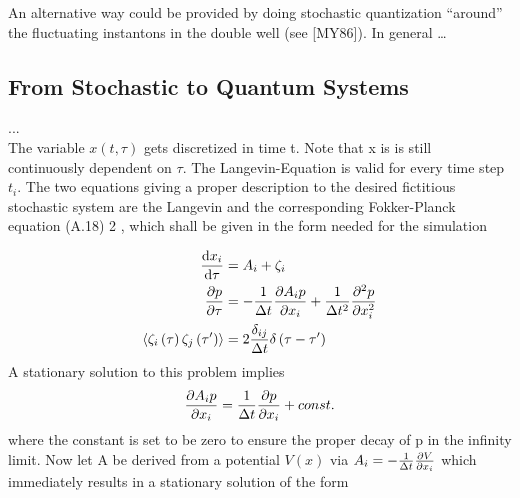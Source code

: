 \documentclass[11pt,a4paper]{scrartcl}
\begin{document}
An alternative way could be provided by doing stochastic quantization
\enquote{around} the fluctuating instantons in the double well (see [MY86]). In general \dots


\vspace{5\baselineskip}



\newpage

\subsection{From Stochastic to Quantum Systems}
...\\
\noindent The variable $x(t,\tau)$ gets discretized in time t. Note that x is is still continuously dependent on $\tau$. The Langevin-Equation is valid for every time step $t_i$. The two equations giving a proper description to the desired fictitious stochastic system
are the Langevin and the corresponding Fokker-Planck equation (A.18) 2 , which shall be
given in the form needed for the simulation

\begin{align}
    \dv{x_i}{\tau} &= A_i + \zeta_i\\
    \pdv{p}{\tau} &= - \frac{1}{\Delta t} \pdv{A_i p}{x_i} + \frac{1}{\Delta t^2} \pdv[2]{p}{x_i}\\
    \langle \zeta_i \left(\tau \right) \zeta_j \left( \tau' \right) \rangle &= 2 \frac{\delta_{ij}}{\Delta t} \delta\left( \tau - \tau' \right)
\end{align}
\noindent A stationary solution to this problem implies
\begin{align}
    \pdv{A_i p}{x_i} = \frac{1}{\Delta t} \pdv{p}{x_i} + const.
\end{align}
where the constant is set to be zero to ensure the proper decay of p in the infinity  limit. Now let A be derived from a potential $V(x)$ via $A_i = - \frac{1}{\Delta t} \pdv{V}{x_i}$ which immediately results in a stationary solution of the form
\end{document}
